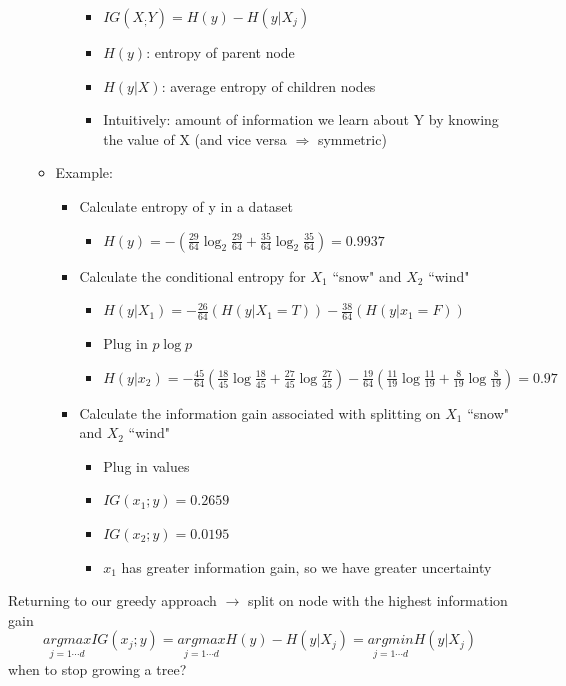 \documentclass[10pt, oneside]{article}
\begin{document}
\begin{itemize}
\begin{itemize}
\begin{itemize}
            \begin{itemize}
                \item $IG(X_;Y) = H(y)-H(y|X_j)$
                \item $H(y)$: entropy of parent node
                \item $H(y|X)$: average entropy of children nodes
                \item Intuitively: amount of information we learn about Y by knowing the value of X (and vice versa $\Rightarrow$ symmetric)
            \end{itemize}
        \end{itemize}
        \item Example:
            \begin{itemize}
                \item Calculate entropy of y in a dataset
                \begin{itemize}
                    \item $H(y) = -(\frac{29}{64}\log_2 \frac{29}{64} + \frac{35}{64}\log_2 \frac{35}{64}) = 0.9937$
                \end{itemize}
                \item Calculate the conditional entropy for $X_1$ ``snow" and $X_2$ ``wind"
                \begin{itemize}
                    \item $H(y|X_1) = - \frac{26}{64} (H(y|X_1 = T)) - \frac{38}{64}( H(y|x_1 = F))$
                    \item Plug in $p\log p$
                    \item $H(y|x_2) = -\frac{45}{64}(\frac{18}{45} \log \frac{18}{45} + \frac{27}{45}\log \frac{27}{45}) - \frac{19}{64}(\frac{11}{19} \log \frac{11}{19} + \frac{8}{19}\log \frac{8}{19}) = 0.97$
                \end{itemize}
                \item Calculate the information gain associated with splitting on $X_1$ ``snow" and $X_2$ ``wind"
                \begin{itemize}
                    \item Plug in values
                    \item $IG(x_1;y) = 0.2659$
                    \item $IG(x_2; y) = 0.0195$
                    \item $x_1$ has greater information gain, so we have greater uncertainty
                \end{itemize}
        \end{itemize}
    \end{itemize}
\end{itemize}
Returning to our greedy approach $\rightarrow$ split on node with the highest information gain
\[\underset{j=1\cdots d}{argmax} IG(x_j; y) = \underset{j=1\cdots d}{argmax} H(y) - H(y|X_j) = \underset{j=1\cdots d}{argmin} H(y|X_j)\]
when to stop growing a tree?
\end{document}
